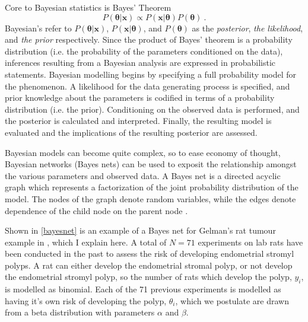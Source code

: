 Core to Bayesian statistics is Bayes' Theorem
%
\begin{equation}\label{Bayes}
	P( \bm{\theta} \vert \mathbf{x}) \propto P(\mathbf{x} \vert \bm{\theta}) P(\bm{\theta}) \>.
\end{equation}
%
Bayesian's refer to $  P( \bm{\theta} \vert \mathbf{x}) $, $ P(\mathbf{x} \vert \bm{\theta})  $, and $P(\bm{\theta})$ as the \textit{posterior}, \textit{the likelihood}, and \textit{the prior} respectively.  Since the product of Bayes' theorem is a probability distribution (i.e. the probability of the parameters conditioned on the data), inferences resulting from a Bayesian analysis are expressed in probabilistic statements. Bayesian modelling begins by specifying a full probability model for the phenomenon.  A likelihood for the data generating process is specified, and prior knowledge about the parameters is codified in terms of a probability distribution (i.e. the prior).  Conditioning on the observed data is performed, and the posterior is calculated and interpreted.  Finally, the resulting model is evaluated and the implications of the resulting posterior are assessed.

Bayesian models can become quite complex, so to ease economy of thought, Bayesian networks (Bayes nets) can be used to exposit the relationship amongst the various parameters and observed data.  A Bayes net is a directed acyclic graph which represents a factorization of the joint probability distribution of the model. The nodes of the graph denote random variables, while the edges denote dependence of the child node on the parent node \cite{Bishop2006pattern}. 

Shown in \cref{bayesnet} is an example of a Bayes net for Gelman's rat tumour example in \cite{gelman2013bayesian}, which I explain here.  A total of $ N = 71 $ experiments on lab rats have been conducted in the past to assess the risk of developing endometrial stromyl polyps.  A rat can either develop the endometrial stromal polyp, or not develop the endometrial stromyl polyp, so the number of rats which develop the polyp, $ y_i $, is modelled as binomial.  Each of the 71 previous experiments is modelled as having it's own risk of developing the polyp, $ \theta_i $, which we postulate are drawn from a beta distribution with parameters $ \alpha $ and $ \beta $.  

